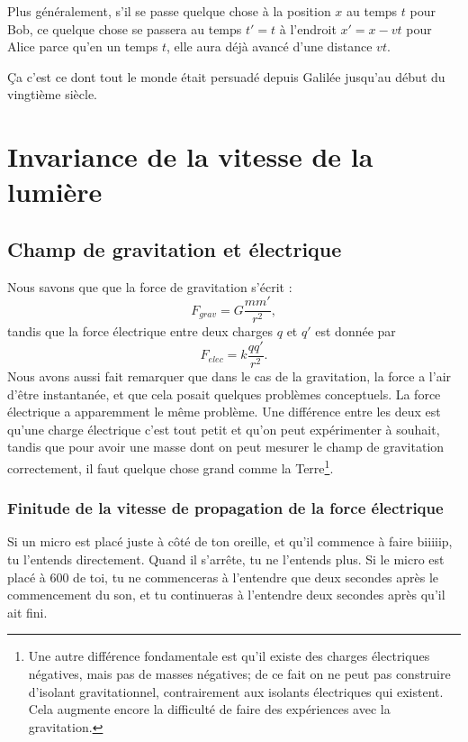 Plus généralement, s'il se passe quelque chose à la position $x$ au temps $t$ pour Bob, ce quelque chose se passera au temps $t'=t$ à l'endroit $x'=x-vt$ pour Alice parce qu'en un temps $t$, elle aura déjà avancé d'une distance $vt$.

Ça c'est ce dont tout le monde était persuadé depuis Galilée jusqu'au début du vingtième siècle.

%
   \section{Invariance de la vitesse de la lumière}
%

\subsection{Champ de gravitation et électrique}

Nous savons que que la force de gravitation s'écrit :
\[
  F_{grav}=G\frac{ mm' }{ r^2 },
\]
tandis que la force électrique entre deux charges $q$ et $q'$ est donnée par
\begin{equation}	\label{EqRappelFelec}
  F_{elec}=k\frac{ qq' }{ r^2 }.
\end{equation}
Nous avons aussi fait remarquer que dans le cas de la gravitation, la force a l'air d'être instantanée, et que cela posait quelques problèmes conceptuels. La force électrique a apparemment le même problème. Une différence entre les deux est qu'une charge électrique c'est tout petit et qu'on peut expérimenter à souhait, tandis que pour avoir une masse dont on peut mesurer le champ de gravitation correctement, il faut quelque chose grand comme la Terre\footnote{Une autre différence fondamentale est qu'il existe des charges électriques négatives, mais pas de masses négatives; de ce fait on ne peut pas construire d'isolant gravitationnel, contrairement aux isolants électriques qui existent. Cela augmente encore la difficulté de faire des expériences avec la gravitation.}.

\subsubsection{Finitude de la vitesse de propagation de la force électrique}

Si un micro est placé juste à côté de ton oreille, et qu'il commence à faire biiiiip, tu l'entends directement. Quand il s'arrête, tu ne l'entends plus. Si le micro est placé à \unit{600}{\meter} de toi, tu ne commenceras à l'entendre que deux secondes après le commencement du son, et tu continueras à l'entendre deux secondes après qu'il ait fini.

